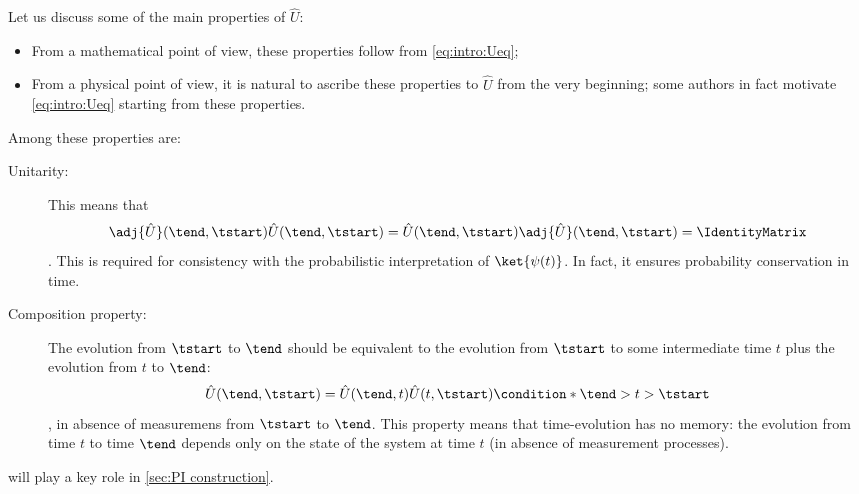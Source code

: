 Let us discuss
some of the main properties of $\hat{U}$:
\begin{itemize}
   \item From a mathematical point of view, these properties follow from
      \cref{eq:intro:Ueq};
   \item From a physical point of view, it is natural to ascribe these
      properties to $\hat{U}$ from the very beginning; some authors in fact motivate
      \cref{eq:intro:Ueq} starting from these properties.
\end{itemize}
Among these properties are:
\begin{description}
   \item[Unitarity:]
This means that
\begin{dmath*}[compact]
   \adj{\hat{U}} (\tend, \tstart) \hat{U} (\tend, \tstart) =
   \hat{U} (\tend, \tstart) \adj{\hat{U}} (\tend, \tstart) = \IdentityMatrix
\end{dmath*}.
This is required for
      consistency  with 
the
probabilistic interpretation of $\ket{\psi(t)}$. In fact, it ensures probability
conservation in time.
   \item[Composition property:]
The evolution from $\tstart$ to $\tend$ should be equivalent to the evolution
from $\tstart$ to some intermediate time $t$ plus the evolution from $t$ to
$\tend$:
\begin{dmath}[label={intro:U:cl}]
      \hat{U}(\tend, \tstart) = \hat{U} (\tend, t) \hat{U} (t, \tstart)
      \condition*{\tend>t>\tstart}
   \end{dmath},
   in absence of measuremens from $\tstart$ to $\tend$.
This property means that time-evolution has no memory: the evolution
from time $t$ to
time $\tend$ depends only on the state of the system at time $t$ (in absence of
measurement processes).
\end{description}
\begin{remark}
     will play a key role in \cref{sec:PI construction}.
\end{remark}

